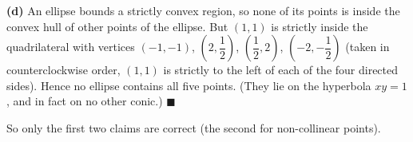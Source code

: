 \textbf{(d)} An ellipse bounds a strictly convex region, so none of its points is inside the convex hull of other points of the ellipse. But $(1,1)$ is strictly inside the quadrilateral with vertices $(-1,-1)$, $\left(2,\dfrac12\right)$, $\left(\dfrac12,2\right)$, $\left(-2,-\dfrac12\right)$ (taken in counterclockwise order, $(1,1)$ is strictly to the left of each of the four directed sides). Hence no ellipse contains all five points. (They lie on the hyperbola $xy=1$, and in fact on no other conic.) $\blacksquare$

So only the first two claims are correct (the second for non-collinear points).
